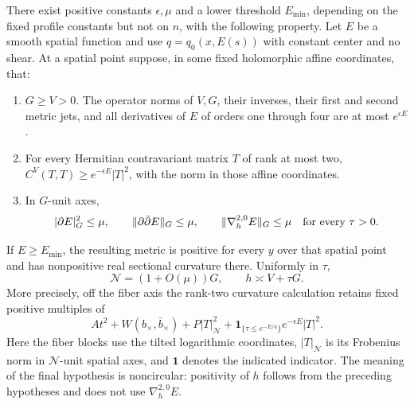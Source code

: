 \begin{proposition}\label{quiet:profile}
There exist positive constants \(\epsilon,\mu\) and a lower threshold
\(E_{\min}\), depending on the fixed profile constants but not on \(n\),
with the following property.  Let \(E\) be a smooth spatial function and
use \(q=q_0(x,E(s))\) with constant center and no shear.  At a spatial
point suppose, in some fixed holomorphic affine coordinates, that:
\begin{enumerate}
\item \(G\ge V>0\).  The operator norms of \(V,G\), their inverses,
their first and second metric jets, and all derivatives of \(E\) of orders
one through four are at most \(e^{\epsilon E}\).
\item For every Hermitian contravariant matrix \(T\) of rank at most two,
\(C^V(T,T)\ge e^{-\epsilon E}|T|^2\), with the norm in those affine
coordinates.
\item In \(G\)-unit axes,
\[
 |\partial E|_G^2\le\mu,\qquad
 \|\partial\bar\partial E\|_G\le\mu,\qquad
 \|\nabla_h^{2,0}E\|_G\le\mu
 \quad\hbox{for every }\tau>0.
\]
\end{enumerate}
If \(E\ge E_{\min}\), the resulting metric is positive for every \(y\)
over that spatial point and has nonpositive real sectional curvature
there.  Uniformly in \(\tau\),
\begin{equation}\label{quiet:schur}
 \mathcal N=(1+O(\mu))G,\qquad
 h\asymp V+\tau G.
\end{equation}
More precisely, off the fiber axis the rank-two curvature calculation
retains fixed positive multiples of
\begin{equation}\label{quiet:margins}
 At^2+W(b_\times,\bar b_\times)+P|T|_{\mathcal N}^2
 +\boldsymbol{1}_{\{\tau\le e^{-E/4}\}}
                          e^{-\epsilon E}|T|^2.
\end{equation}
Here the fiber blocks use the tilted logarithmic coordinates,
\(|T|_{\mathcal N}\) is its Frobenius norm in \(\mathcal N\)-unit
spatial axes, and \(\boldsymbol{1}\) denotes the indicated indicator.
The meaning of the final hypothesis is noncircular: positivity of \(h\)
follows from the preceding hypotheses and does not use
\(\nabla_h^{2,0}E\).
\end{proposition}

